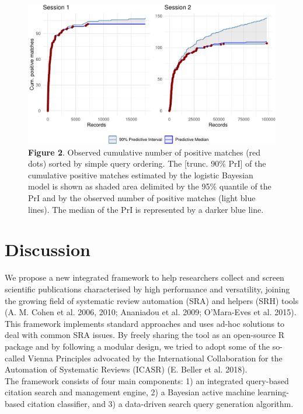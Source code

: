 \documentclass{article}
\begin{document}
\begin{figure}
\centering
\includegraphics{Manuscript_files/figure-latex/performance plot-1.pdf}
\caption{\textbf{Figure 2}. Observed cumulative number of positive
matches (red dots) sorted by simple query ordering. The {[}trunc. 90\%
PrI{]} of the cumulative positive matches estimated by the logistic
Bayesian model is shown as shaded area delimited by the 95\% quantile of
the PrI and by the observed number of positive matches (light blue
lines). The median of the PrI is represented by a darker blue line.}
\end{figure}

\hypertarget{discussion}{%
\section{Discussion}\label{discussion}}

We propose a new integrated framework to help researchers collect and
screen scientific publications characterised by high performance and
versatility, joining the growing field of systematic review automation
(SRA) and helpers (SRH) tools (A. M. Cohen et al. 2006, 2010; Ananiadou
et al. 2009; O'Mara-Eves et al. 2015). This framework implements
standard approaches and uses ad-hoc solutions to deal with common SRA
issues. By freely sharing the tool as an open-source R package and by
following a modular design, we tried to adopt some of the so-called
Vienna Principles advocated by the International Collaboration for the
Automation of Systematic Reviews (ICASR) (E. Beller et al. 2018).\\
The framework consists of four main components: 1) an integrated
query-based citation search and management engine, 2) a Bayesian active
machine learning-based citation classifier, and 3) a data-driven search
query generation algorithm.\\
\end{document}
